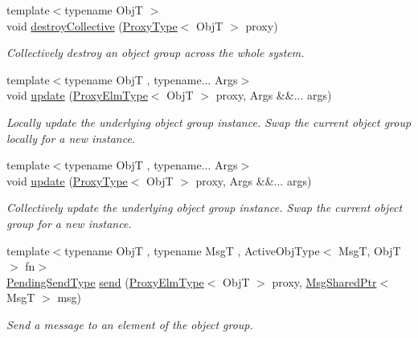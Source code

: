 \begin{DoxyCompactItemize}
{\footnotesize template$<$typename ObjT $>$ }\\void \hyperlink{structvt_1_1objgroup_1_1_obj_group_manager_ad02bff10088a4f8e453cf24bd832308c}{destroy\+Collective} (\hyperlink{structvt_1_1objgroup_1_1_obj_group_manager_aea65eef52f240a52210132eef5ce591f}{Proxy\+Type}$<$ ObjT $>$ proxy)
\begin{DoxyCompactList}\small\item\em Collectively destroy an object group across the whole system. \end{DoxyCompactList}\item 
{\footnotesize template$<$typename ObjT , typename... Args$>$ }\\void \hyperlink{structvt_1_1objgroup_1_1_obj_group_manager_abd0f61b0578a268a27420f2c38e3b12d}{update} (\hyperlink{structvt_1_1objgroup_1_1_obj_group_manager_adba6c8ecb0f4c30e719f1abb995cfc9b}{Proxy\+Elm\+Type}$<$ ObjT $>$ proxy, Args \&\&... args)
\begin{DoxyCompactList}\small\item\em Locally update the underlying object group instance. Swap the current object group locally for a new instance. \end{DoxyCompactList}\item 
{\footnotesize template$<$typename ObjT , typename... Args$>$ }\\void \hyperlink{structvt_1_1objgroup_1_1_obj_group_manager_a36d8749cf4f42e6b912159e9b4f959d6}{update} (\hyperlink{structvt_1_1objgroup_1_1_obj_group_manager_aea65eef52f240a52210132eef5ce591f}{Proxy\+Type}$<$ ObjT $>$ proxy, Args \&\&... args)
\begin{DoxyCompactList}\small\item\em Collectively update the underlying object group instance. Swap the current object group for a new instance. \end{DoxyCompactList}\item 
{\footnotesize template$<$typename ObjT , typename MsgT , Active\+Obj\+Type$<$ Msg\+T, Obj\+T $>$ fn$>$ }\\\hyperlink{structvt_1_1objgroup_1_1_obj_group_manager_a4f82f640edf670ba5a282074e5710921}{Pending\+Send\+Type} \hyperlink{structvt_1_1objgroup_1_1_obj_group_manager_a28589f1c420841f18810fbf870c30bad}{send} (\hyperlink{structvt_1_1objgroup_1_1_obj_group_manager_adba6c8ecb0f4c30e719f1abb995cfc9b}{Proxy\+Elm\+Type}$<$ ObjT $>$ proxy, \hyperlink{namespacevt_ab2b3d506ec8e8d1540aede826d84a239}{Msg\+Shared\+Ptr}$<$ MsgT $>$ msg)
\begin{DoxyCompactList}\small\item\em Send a message to an element of the object group. \end{DoxyCompactList}\item 

\end{DoxyCompactItemize}
